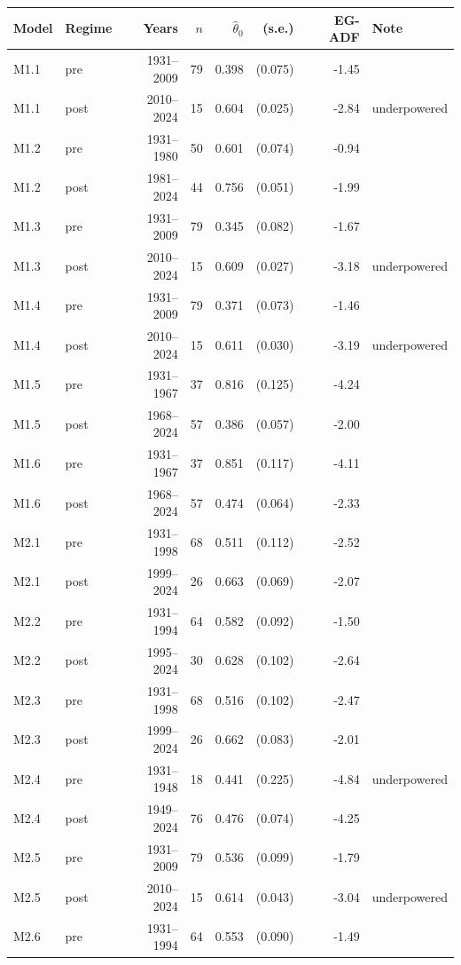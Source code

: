 \documentclass[11pt,a4paper]{article}
\begin{document}
\begin{longtable}{llrrrrrl}
\toprule
Model & Regime & Years & $n$ & $\hat\theta_0$ & (s.e.) & EG-ADF & Note \\
\midrule
\endhead
M1.1 & pre & 1931--2009 & 79 & 0.398 & (0.075) & -1.45 &  \\
M1.1 & post & 2010--2024 & 15 & 0.604 & (0.025) & -2.84 & underpowered \\
M1.2 & pre & 1931--1980 & 50 & 0.601 & (0.074) & -0.94 &  \\
M1.2 & post & 1981--2024 & 44 & 0.756 & (0.051) & -1.99 &  \\
M1.3 & pre & 1931--2009 & 79 & 0.345 & (0.082) & -1.67 &  \\
M1.3 & post & 2010--2024 & 15 & 0.609 & (0.027) & -3.18 & underpowered \\
M1.4 & pre & 1931--2009 & 79 & 0.371 & (0.073) & -1.46 &  \\
M1.4 & post & 2010--2024 & 15 & 0.611 & (0.030) & -3.19 & underpowered \\
M1.5 & pre & 1931--1967 & 37 & 0.816 & (0.125) & -4.24 &  \\
M1.5 & post & 1968--2024 & 57 & 0.386 & (0.057) & -2.00 &  \\
M1.6 & pre & 1931--1967 & 37 & 0.851 & (0.117) & -4.11 &  \\
M1.6 & post & 1968--2024 & 57 & 0.474 & (0.064) & -2.33 &  \\
M2.1 & pre & 1931--1998 & 68 & 0.511 & (0.112) & -2.52 &  \\
M2.1 & post & 1999--2024 & 26 & 0.663 & (0.069) & -2.07 &  \\
M2.2 & pre & 1931--1994 & 64 & 0.582 & (0.092) & -1.50 &  \\
M2.2 & post & 1995--2024 & 30 & 0.628 & (0.102) & -2.64 &  \\
M2.3 & pre & 1931--1998 & 68 & 0.516 & (0.102) & -2.47 &  \\
M2.3 & post & 1999--2024 & 26 & 0.662 & (0.083) & -2.01 &  \\
M2.4 & pre & 1931--1948 & 18 & 0.441 & (0.225) & -4.84 & underpowered \\
M2.4 & post & 1949--2024 & 76 & 0.476 & (0.074) & -4.25 &  \\
M2.5 & pre & 1931--2009 & 79 & 0.536 & (0.099) & -1.79 &  \\
M2.5 & post & 2010--2024 & 15 & 0.614 & (0.043) & -3.04 & underpowered \\
M2.6 & pre & 1931--1994 & 64 & 0.553 & (0.090) & -1.49 &  \\

\end{longtable}
\end{document}
